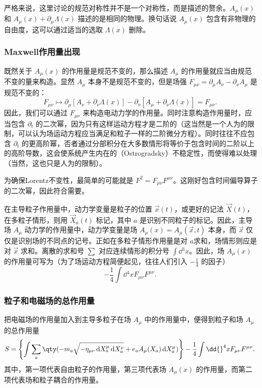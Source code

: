 严格来说，这里讨论的规范对称性并不是一个对称性，而是描述的赘余。$A_\mu(x)$ 和 $A_\mu(x)+\partial_\mu\Lambda(x)$ 描述的是相同的物理。换句话说 $A_\mu(x)$ 包含有非物理的自由度，这可以通过适当的选取 $\Lambda(x)$ 删除。

\subsubsection{Maxwell作用量出现}

既然关于 $A_\mu(x)$ 的作用量是规范不变的，那么描述 $A_\mu$ 的作用量就应当由规范不变的量来构造。显然 $A_\mu$ 本身不是规范不变的，但是场强 $F_{\mu\nu}=\partial_\mu A_\nu-\partial_\nu A_\mu$ 是规范不变的：
\begin{equation}
F_{\mu\nu}\mapsto \partial_\mu[ A_\nu+\partial_\nu\Lambda(x)]-\partial_\nu[ A_\mu+\partial_\nu\Lambda(x)]=F_{\mu\nu}.~
\end{equation}
因此，我们可以通过 $F_{\mu\nu}$ 来构造电动力学的作用量。同时注意构造作用量时，应当包含 $\partial_t$ 的二次幂，因为只有这样运动方程才是二阶的（这当然是一个人为的限制，可以认为场运动方程应当满足和粒子一样的二阶微分方程）。同时往往不应包含 $\partial_t$ 的更高阶幂，否者通过分部积分在大多数情形将等价于包含时间的二阶以上的高阶导数，这会使系统产生内在的（Ostrogradsky）不稳定性，而使得难以处理（当然，这也只是人为的限制）。

为确保Lorentz不变性，最简单的可能就是 $F^2=F_{\mu\nu}F^{\mu\nu}$。这刚好包含时间偏导算子的二次幂，因此符合需要。

在主导粒子作用量中，动力学变量是粒子的位置 $\vec x(t)$，或更好的记法 $\vec X(t)$，在多粒子情形，则用 $\vec X_a(t)$ 标记，其中 $a$ 是识别不同粒子的标记。因此，主导场 $A_\mu$ 动力学的作用量中，动力学变量是场 $A_\mu(x)=A_\mu(\vec x,t)$ 本身，而 $\vec x$ 仅仅是识别场的不同点的记号。正如在多粒子情形作用量是对 $a$求和，场情形则应是对 $\vec x$ 求和。离散的求和号 $\sum$ 对应连续情形的积分号 $\int\dd{}^3 x$。因此，场 $A_\mu(x)$ 的作用量可写为（为了场运动方程简便起见，往往人们引入 $-\frac{1}{4}$ 的因子）
\begin{equation}
-\frac{1}{4}\int\dd{}^4 x F_{\mu\nu}F^{\mu\nu}.~
\end{equation}

\subsubsection{粒子和电磁场的总作用量}

把电磁场的作用量加入到主导多粒子在场 $A_\mu$ 中的作用量中，便得到粒子和场 $A_\mu$ 的总作用量
\begin{equation}
 S=\left\{\int\sum_a\qty(-m_a\sqrt{-\eta_{\mu\nu} \,\mathrm{d} X_a ^\mu \,\mathrm{d}X_a ^\nu}+e_aA_\mu(X_a) \,\mathrm{d}X_a ^\mu) \right\}-\frac{1}{4}\int\dd{}^4 x F_{\mu\nu}F^{\mu\nu}.~
\end{equation}
其中，第一项代表自由粒子的作用量，第三项代表场 $A_\mu(x)$ 的作用量，而第二项代表场和粒子耦合的作用量。









